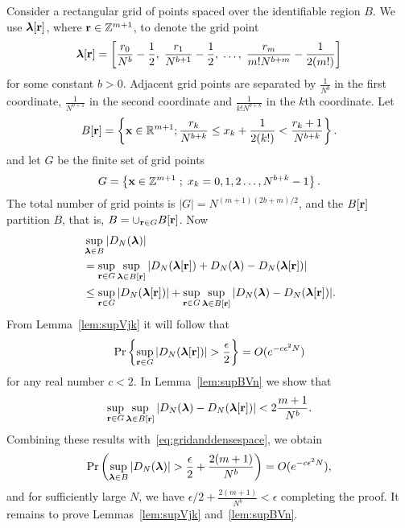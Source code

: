 \documentclass[journal]{IEEEtran}
\begin{document}
\begin{IEEEproof}
Consider a rectangular grid of points spaced over the identifiable region $B$.  We use $\boldsymbol{\lambda}[\mathbf{r}]$, where $\mathbf{r} \in {\mathbb Z}^{m+1}$, to denote the grid point 
\[ 
 \boldsymbol{\lambda}[\mathbf{r}] = \left[  \frac{r_0}{N^{b}} - \frac{1}{2}, \; \frac{r_1}{N^{b+1}} - \frac{1}{2}, \; \dots, \; \frac{r_m}{m!N^{b+m}} - \frac{1}{2(m!) }\right]
\]
 for some constant $b>0$.  Adjacent grid points are separated by $\tfrac{1}{N^b}$ in the first coordinate, $\tfrac{1}{N^{b+1}}$ in the second coordinate and $\tfrac{1}{k!N^{b+k}}$ in the $k$th coordinate. Let
 \[
 B[\mathbf{r}]=\left\{  \mathbf{x}\in{\mathbb R}^{m+1}  ; \frac{r_k}{N^{b+k}}\leq x_k + \frac{1}{2(k!)} < \frac{r_k + 1}{N^{b+k}} \right\}  .
 \]
and let $G$ be the finite set of grid points
\[
G = \left\{ \mathbf{x} \in {\mathbb Z}^{m+1} \; ; \; x_k = 0,1,2\dots,N^{b+k}-1  \right\}.
\]
The total number of grid points is $|G| = N^{(m+1)(2b + m)/2}$, and the $B[\mathbf{r}]$ partition $B$, that is, $B = \cup_{\mathbf{r} \in G}B[\mathbf{r}]$.  Now 
\begin{align}
 &\sup_{\lambdabf \in B}\sabs{ D_N(\lambdabf) }  \nonumber \\
&= \sup_{\rbf \in G}\sup_{ \lambdabf \in B[\rbf]}\sabs{ D_N(\lambdabf[\rbf]) + D_N(\lambdabf) - D_N(\lambdabf[\rbf])  } \nonumber \\
 &\leq \sup_{\rbf \in G}\sabs{ D_N(\lambdabf[\rbf])} + \sup_{\rbf \in G}\sup_{\lambdabf\in B[\rbf]}\sabs{ D_N(\lambdabf) - D_N(\lambdabf[\rbf])  }. \label{eq:gridanddensespace}
 \end{align}
From Lemma~\ref{lem:supVjk} it will follow that
\[
\operatorname{Pr}\left\{   \sup_{\mathbf{r} \in G }\left\vert  D_N(\boldsymbol{\lambda}[\mathbf{r}])   \right\vert > \frac{\epsilon}{2} \right\} = O(e^{-c \epsilon^2 N})
\]
for any real number $c < 2$.
In Lemma~\ref{lem:supBVn} we show that
\[
\sup_{\mathbf{r} \in G}\sup_{\boldsymbol{\lambda}\in B[\mathbf{r}]}\left\vert  D_N(\boldsymbol{\lambda}) - D_N(\boldsymbol{\lambda}[\mathbf{r}]) \right\vert < 2\frac{m+1}{N^b}.
\]
Combining these results with~\eqref{eq:gridanddensespace}, we obtain
\[
\operatorname{Pr}\left(\sup_{\boldsymbol{\lambda} \in B }\vert  D_N(\boldsymbol{\lambda}) \vert > \frac{\epsilon}{2} +  \frac{2(m+1)}{N^b} \right) = O(e^{-c \epsilon^2 N}),
\]
and for sufficiently large $N$, we have $\epsilon/2 + \frac{2(m+1)}{N^b} < \epsilon$ completing the proof.  It remains to prove Lemmas~\ref{lem:supVjk} and~\ref{lem:supBVn}.
\end{IEEEproof}
\end{document}
